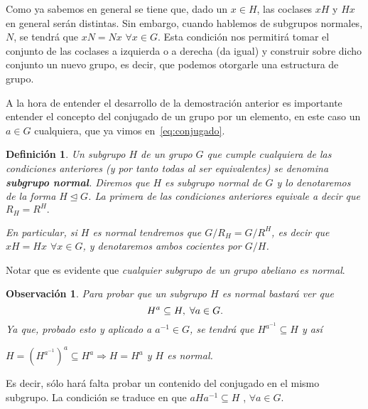 \documentclass[12pt]{article}
\newtheorem{definition}[theorem]{Definición}
\newtheorem{observation}{Observación}[theorem]
\begin{document}
Como ya sabemos en general se tiene que, dado un $x \in H$, las coclases $xH$ y $Hx$ en general serán distintas. Sin embargo, cuando hablemos de subgrupos normales, $N$, se tendrá que $xN = Nx$ $\forall x \in G$. Esta condición nos permitirá tomar el conjunto de las coclases a izquierda o a derecha (da igual) y construir sobre dicho conjunto un nuevo grupo, es decir, que podemos otorgarle una estructura de grupo.

A la hora de entender el desarrollo de la demostración anterior es importante entender el concepto del conjugado de un grupo por un elemento, en este caso un $a \in G$ cualquiera, que ya vimos en~\ref{eq:conjugado}.

\begin{definition} Un subgrupo $H$ de un grupo $G$ que cumple cualquiera de las condiciones anteriores (y por tanto todas al ser equivalentes) se denomina \textbf{ subgrupo normal}. Diremos que $H$ es \textit{subgrupo normal} de $G$ y lo denotaremos de la forma $H\unlhd G$.
La primera de las condiciones anteriores equivale a decir que $R_{H} = R^{H}.$

En particular, si $H$ es normal tendremos que $G/R_{H} = G/R^{H}$, es decir que $xH = Hx$ $\forall x \in G$, y denotaremos ambos cocientes por $G/H$.
\end{definition}

Notar que es evidente que \textit{cualquier subgrupo de un grupo abeliano es normal}.

\begin{observation}Para probar que un subgrupo $H$ es normal bastará ver que $$H^{a} \subseteq H, \hspace{0.1cm} \forall a \in G.$$ Ya que, probado esto y aplicado a $a^{-1} \in G$, se tendrá que $H^{a^{-1}}\subseteq H$ y así 
\begin{center}
$H = (H^{a^{-1}})^{a} \subseteq H^{a} \Longrightarrow H = H^{a}$ y $H$ es normal.
\end{center} 
\end{observation}

Es decir, sólo hará falta probar un contenido del conjugado en el mismo subgrupo. La condición se traduce en que $aHa^{-1} \subseteq H$ , $\forall a \in G$.
\end{document}
